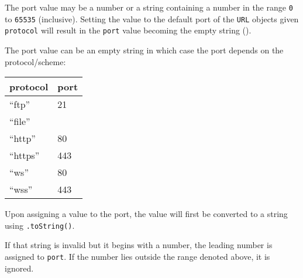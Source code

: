 The port value may be a number or a string containing a number in the
range \texttt{0} to \texttt{65535} (inclusive). Setting the value to the
default port of the \texttt{URL} objects given \texttt{protocol} will
result in the \texttt{port} value becoming the empty string
(\texttt{\textquotesingle{}\textquotesingle{}}).

The port value can be an empty string in which case the port depends on
the protocol/scheme:

\begin{longtable}[]{@{}ll@{}}
\toprule\noalign{}
protocol & port \\
\midrule\noalign{}
\endhead
\bottomrule\noalign{}
\endlastfoot
``ftp'' & 21 \\
``file'' & \\
``http'' & 80 \\
``https'' & 443 \\
``ws'' & 80 \\
``wss'' & 443 \\
\end{longtable}

Upon assigning a value to the port, the value will first be converted to
a string using \texttt{.toString()}.

If that string is invalid but it begins with a number, the leading
number is assigned to \texttt{port}. If the number lies outside the
range denoted above, it is ignored.

